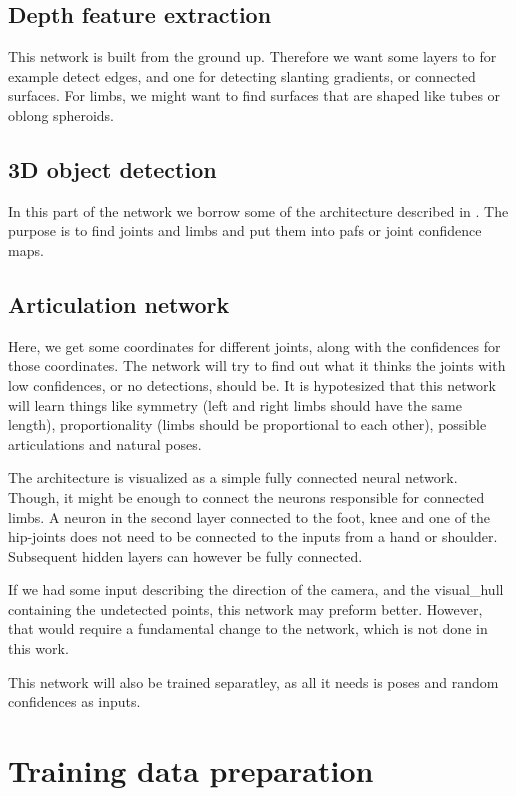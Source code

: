 \subsection{Depth feature extraction}\label{subsec:depth_feature}
This network is built from the ground up. Therefore we want some layers to for example detect edges, and one for detecting slanting gradients, or connected surfaces. For limbs, we might want to find surfaces that are shaped like tubes or oblong spheroids.

\subsection{3D object detection}\label{subsec:obj_detect}
In this part of the network we borrow some of the architecture described in \cite{cao2017realtime}. The purpose is to find joints and limbs and put them into \gls{paf}s or joint confidence maps. 

\subsection{Articulation network}\label{subsec:articulation}
Here, we get some coordinates for different joints, along with the confidences for those coordinates. The network will try to find out what it thinks the joints with low confidences, or no detections, should be. It is hypotesized that this network will learn things like symmetry (left and right limbs should have the same length), proportionality (limbs should be proportional to each other), possible articulations and natural poses.

The architecture is visualized as a simple fully connected neural network. Though, it might be enough to connect the neurons responsible for connected limbs. A neuron in the second layer connected to the foot, knee and one of the hip-joints does not need to be connected to the inputs from a hand or shoulder. Subsequent hidden layers can however be fully connected.

If we had some input describing the direction of the camera, and the \gls{visual_hull} containing the undetected points, this network may preform better. However, that would require a fundamental change to the network, which is not done in this work.

This network will also be trained separatley, as all it needs is poses and random confidences as inputs.


\section{Training data preparation}

